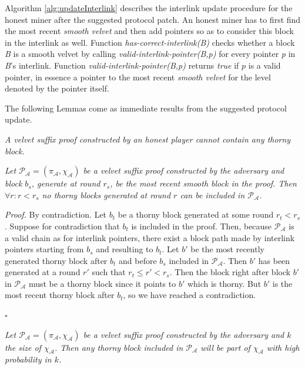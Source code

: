 Algorithm \ref{alg:updateInterlink} describes the interlink update procedure for the
honest miner after the suggested protocol patch. An honest miner has to first find the
most recent \emph{smooth velvet} and then add pointers so as to consider this block in
the interlink as well. Function \textit{has-correct-interlink(B)} checks whether a
block \textit{B} is a smooth velvet by calling \textit{valid-interlink-pointer(B,p)}
for every pointer \textit{p} in \textit{B}'s interlink. Function
\textit{valid-interlink-pointer(B,p)} returns \emph{true} if $p$ is a valid 
pointer, in essence a pointer to the most recent \emph{smooth velvet}
for the level denoted by the pointer itself. 

The following Lemmas come as immediate results from the suggested protocol
update.\\

\begin{lemma}
	\textit{A velvet suffix proof constructed by an honest player cannot contain
	any thorny block.}
	\label{lemm:smooth_honest_suffix}
\end{lemma}

\begin{lemma} 
	\textit{Let $\mathcal{P_A} = (\pi_\mathcal{A}, \chi_\mathcal{A})$
	be a velvet suffix proof constructed by the adversary and block $b_s$, generate
	at round $r_s$, be the most recent smooth block in the proof. Then $\forall r:r < r_s$
	no thorny blocks generated at round $r$ can be included in $\mathcal{P_A}$.}
	\label{lemm:smooths_before_smooth}
\end{lemma}
\textit{Proof.} By contradiction. Let $b_t$ be a thorny block generated at
some round $r_t < r_s$. Suppose for contradiction that $b_t$ is included in
the proof. Then, because $\mathcal{P_A}$ is a valid chain as for interlink
pointers, there exist a block path made by interlink pointers starting from $b_s$
and resulting to $b_t$. Let $b'$ be the most recently generated thorny block
after $b_t$ and before $b_s$ included in $\mathcal{P_A}$. 
Then $b'$ has been generated at a round $r'$ such that $r_t \leq r' < r_s$. Then
the block right after block $b'$ in $\mathcal{P_A}$ must be a thorny block since
it points to $b'$ which is thorny. But $b'$ is the most recent thorny block after
$b_t$, so we have reached a contradiction.
\begin{flushright}
$\square$
\end{flushright}

\begin{lemma}
	\textit{Let $\mathcal{P_A} = (\pi_\mathcal{A}, \chi_\mathcal{A})$
	be a velvet suffix proof constructed by the adversary and $k$ the size of
	$\chi_{\mathcal{A}}$. Then any thorny block included in $\mathcal{P_A}$ will
	be part of $\chi_{\mathcal{A}}$ with high probability in $k$.}
\end{lemma}

